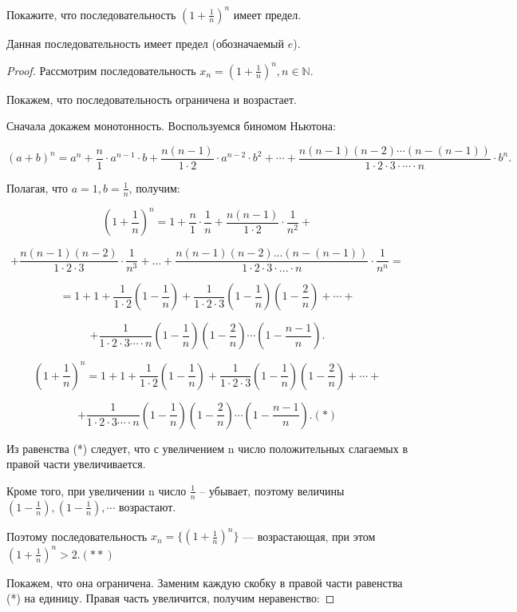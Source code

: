 Покажите, что последовательность $(1 + \frac{1}{n})^n$ имеет предел.

\begin{ther}
    Данная последовательность имеет предел (обозначаемый $e$).
\end{ther}

\begin{proof}
        Рассмотрим последовательность $x_n= (1+\frac{1}{n})^n, n \in \mathbb{N}$.

        Покажем, что последовательность ограничена и возрастает.

        Сначала докажем монотонность. Воспользуемся биномом Ньютона:

        $$(a+b)^n= a^{n}+\frac{n}{1}\cdot a^{n-1}\cdot b+\frac{n (n-1)}{1\cdot 2}\cdot a^{n-2}\cdot b^{2}+ \cdots +\frac{n (n-1) (n-2)\cdots (n- (n-1))}{1\cdot 2\cdot 3\cdot \cdots \cdot n}\cdot b^{n}.$$

        Полагая, что  $a= 1, b= \frac{1}{n}$,  получим:

        $$(1+\frac{1}{n})^{n}= 1+\frac{n}{1}\cdot \frac{1}{n}+\frac{n (n-1)}{1\cdot 2}\cdot \frac{1}{n^{2}}+$$

        $$+\frac{n (n-1) (n-2)}{1\cdot 2\cdot 3}\cdot \frac{1}{n^{3}}+ \ldots + \frac{n (n-1) (n-2)... (n- (n-1))}{1\cdot 2\cdot 3\cdot ...\cdot n}\cdot \frac{1}{n^{n}}= $$

        $$= 1+1+\frac{1}{1\cdot 2} (1-\frac{1}{n})+\frac{1}{1\cdot 2\cdot 3} (1-\frac{1}{n}) (1-\frac{2}{n})+\cdots + $$

        $$+\frac{1}{1\cdot 2\cdot 3\cdots \cdot n} (1-\frac{1}{n}) (1-\frac{2}{n})\cdots (1-\frac{n-1}{n}).$$

        $$(1+\frac{1}{n})^{n}= 1+1+\frac{1}{1\cdot 2} (1-\frac{1}{n})+\frac{1}{1\cdot 2\cdot 3} (1-\frac{1}{n}) (1-\frac{2}{n})+ \cdots + $$

        $$+ \frac{1}{1\cdot 2\cdot 3\cdots\cdot n} (1-\frac{1}{n}) (1-\frac{2}{n})\cdots (1-\frac{n-1}{n}). (*)$$

        Из равенства (*) следует, что с увеличением n  число положительных слагаемых в правой части увеличивается.

        Кроме того, при увеличении n число $\frac{1}{n}$ – убывает,
        поэтому величины $(1-\frac{1}{n}), (1-\frac{1}{n}), \cdots$ возрастают.

        Поэтому последовательность ${x_n} =  \{ (1+\frac{1}{n})^{n}\}$  — возрастающая, при этом $(1+\frac{1}{n})^{n}>2. (**)$

        Покажем, что она ограничена. Заменим каждую скобку в правой части равенства (*) на единицу. Правая часть увеличится, получим неравенство:


\end{proof}
